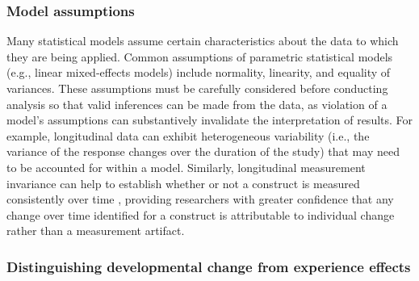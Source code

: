 \documentclass[
  number,
  preprint,
  3p,
  twocolumn]{elsarticle}
\begin{document}
\hypertarget{model-assumptions}{%
\subsubsection{Model assumptions}\label{model-assumptions}}

Many statistical models assume certain characteristics about the data to
which they are being applied. Common assumptions of parametric
statistical models (e.g., linear mixed-effects models) include
normality, linearity, and equality of variances. These assumptions must
be carefully considered before conducting analysis so that valid
inferences can be made from the data, as violation of a model's
assumptions can substantively invalidate the interpretation of results.
For example, longitudinal data can exhibit heterogeneous variability
(i.e., the variance of the response changes over the duration of the
study) that may need to be accounted for within a model. Similarly,
longitudinal measurement invariance can help to establish whether or not
a construct is measured consistently over time
\citep{liu2017, van2015, willoughby2012}, providing researchers with
greater confidence that any change over time identified for a construct
is attributable to individual change rather than a measurement artifact.

\hypertarget{distinguishing-developmental-change-from-experience-effects}{%
\subsubsection{Distinguishing developmental change from experience
effects}\label{distinguishing-developmental-change-from-experience-effects}}
\end{document}
